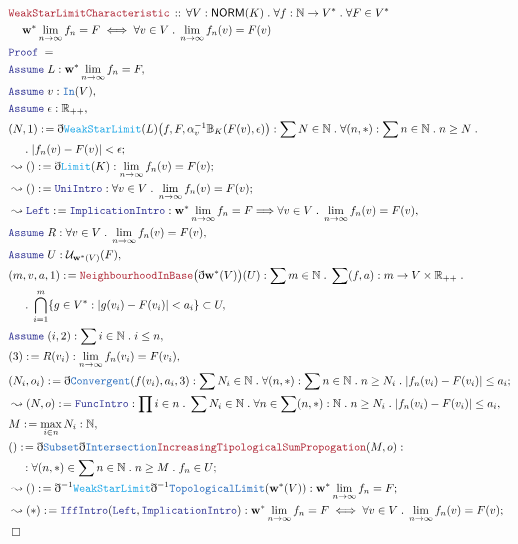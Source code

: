 \documentclass[12pt]{scrartcl}
\newcommand{\TYPE}[1]{\textcolor{NavyBlue}{\mathtt{#1}}}
\newcommand{\FUNC}[1]{\textcolor{Cerulean}{\mathtt{#1}}}
\newcommand{\LOGIC}[1]{\textcolor{Blue}{\mathtt{#1}}}
\newcommand{\THM}[1]{\textcolor{Maroon}{\mathtt{#1}}}
\renewcommand{\.}{\; . \;}
\newcommand{\de}{: \kern 0.1pc =}
\newcommand{\Theorem}[2]{& \THM{#1} \, :: \, #2 \\ & \Proof = \\ }
\newcommand{\NewLine}{\\ & \kern 1pc}
\newcommand{\Page}[1]{\begin{align*} #1 \end{align*} \newpage   }
\newcommand{ \bd }{ \ByDef }
\newcommand{\Reals}{\mathbb{R} }
\newcommand{\Nat}{\mathbb{N} }
\newcommand{\Say}[3]{& #1 \de #2 : #3, \\}
\newcommand{\Conclude}[3]{& #1 \de #2 : #3; \\}
\newcommand{\Derive}[3]{& \leadsto #1 \de #2 : #3, \\}
\newcommand{\DeriveConclude}[3]{& \leadsto #1 \de #2 : #3 ; \\}
\newcommand{\A}{\LOGIC{Assume} \;}
\newcommand{\Assume}[2]{& \A #1 : #2, \\}
\newcommand{\QED}{\; \square}
\newcommand{\EndProof}{& \QED \\}
\newcommand{\ByDef}{\eth}
\newcommand{\Proof}{\LOGIC{Proof} \; }
\newcommand{\NORM}{\textsf{NORM}}
\begin{document}
\Page{
\Theorem{WeakStarLimitCharacteristic}{\forall V : \NORM(K) \. \forall f : \Nat \to V^* \. \forall F \in V^*
\NewLine
 \mathbf{w}^* \- \lim_{n \to \infty} f_n = F \iff  \forall v \in V \. \lim_{n \to \infty} f_n(v) = F(v)
}
\Assume{L}{\mathbf{w}^* \- \lim_{n \to \infty} f_n = F }
\Assume{v}{\TYPE{In}(V)}
\Assume{\epsilon}{\Reals_{++}}
\Conclude{(N,1)}{\bd \FUNC{WeakStarLimit}(L)\big(f,F,\alpha_v^{-1}\mathbb{B}_K(F(v),\epsilon)\big)}{ \sum N \in \Nat \. \forall (n,*) : \sum n \in \Nat \. n \ge N \. \NewLine \. |f_n(v) - F(v)| < \epsilon   }
\DeriveConclude{()}{\bd \FUNC{Limit}(K)}{\lim_{n \to \infty} f_n(v) = F(v)}
\DeriveConclude{()}{\LOGIC{UniIntro}}{\forall v \in V \. 
\lim_{n \to \infty} f_n(v) = F(v) }
\Derive{\LOGIC{Left}}{\LOGIC{ImplicationIntro}}{ \mathbf{w}^*\-\lim_{n \to \infty} f_n = F \Longrightarrow \forall v \in V \. \lim_{n \to \infty} f_n(v) = F(v)}
\Assume{R}{\forall v \in V \. \lim_{n \to \infty} f_n(v) = F(v)}
\Assume{U}{ \mathcal{U}_{\mathbf{w}^*(V)}(F)}
\Say{(m,v,a,1)}{\THM{NeighbourhoodInBase}\big(\bd \mathbf{w}^*(V)\big)(U)}{\sum m \in \Nat \.  \sum (f,a) : m \to V \times \Reals_{++} \. 
\NewLine
\. \bigcap^m_{i = 1}\{ g \in V^* : |g(v_i) - F(v_i)| < a_i \} \subset U
  }
 \Assume{(i,2)}{\sum i \in \Nat \. i \le n }
\Say{(3)}{R(v_i)}{\lim_{n \to \infty} f_n(v_i) = F(v_i)}
\Conclude{(N_i,o_i)}{\bd \TYPE{Convergent}(f(v_i), a_i,3)}{\sum N_i \in \Nat \.  \forall (n,*) : \sum n \in \Nat \. n \ge N_i \. | f_n(v_i) - F(v_i) | \le a_i }
\Derive{(N,o)}{\LOGIC{FuncIntro}}{ \prod i \in n \. \sum N_i \in \Nat \.  \forall n \in \sum (n,*) : \Nat \. n \ge N_i \. | f_n(v_i) - F(v_i) | \le a_i}
\Say{M}{ \max_{i \in n} N_i  }{\Nat}
\Conclude{()}{ \bd \TYPE{Subset} \bd \TYPE{Intersection}\THM{IncreasingTipologicalSumPropogation}(M, o) }{ 
 \NewLine : \forall (n,*) \in \sum n \in \Nat \. n \ge M \. f_n \in U}
\DeriveConclude{()}{\bd^{-1}\FUNC{WeakStarLimit}\bd^{-1} \TYPE{TopologicalLimit}(\mathbf{w}^*(V))}{ \mathbf{w}^*\-\lim_{n \to \infty} f_n = F }
\DeriveConclude{(*)}{\LOGIC{IffIntro}(\LOGIC{Left}, \LOGIC{ImplicationIntro})}
{\mathbf{w}^* \- \lim_{n \to \infty} f_n = F \iff  \forall v \in V \. \lim_{n \to \infty} f_n(v) = F(v)}
\EndProof
  }
\end{document}
